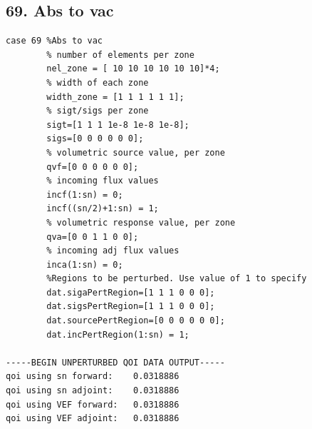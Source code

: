 \documentclass{article}
\begin{document}
\subsection{69. Abs to vac}
\begin{verbatim}
case 69 %Abs to vac
        % number of elements per zone
        nel_zone = [ 10 10 10 10 10 10]*4;
        % width of each zone
        width_zone = [1 1 1 1 1 1];
        % sigt/sigs per zone
        sigt=[1 1 1 1e-8 1e-8 1e-8];
        sigs=[0 0 0 0 0 0];
        % volumetric source value, per zone
        qvf=[0 0 0 0 0 0];
        % incoming flux values
        incf(1:sn) = 0;
        incf((sn/2)+1:sn) = 1;
        % volumetric response value, per zone
        qva=[0 0 1 1 0 0];
        % incoming adj flux values
        inca(1:sn) = 0;
        %Regions to be perturbed. Use value of 1 to specify
        dat.sigaPertRegion=[1 1 1 0 0 0];
        dat.sigsPertRegion=[1 1 1 0 0 0];
        dat.sourcePertRegion=[0 0 0 0 0 0];
        dat.incPertRegion(1:sn) = 1;   
        
-----BEGIN UNPERTURBED QOI DATA OUTPUT----- 
qoi using sn forward: 	 0.0318886 
qoi using sn adjoint: 	 0.0318886 
qoi using VEF forward: 	 0.0318886 
qoi using VEF adjoint: 	 0.0318886 
\end{verbatim}
\end{document}
